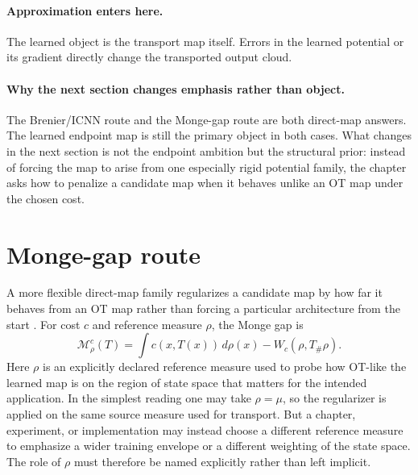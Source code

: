 \paragraph{Approximation enters here.}
The learned object is the transport map itself.  Errors in the learned potential
or its gradient directly change the transported output cloud.

\paragraph{Why the next section changes emphasis rather than object.}
The Brenier/ICNN route and the Monge-gap route are both direct-map answers.  The
learned endpoint map is still the primary object in both cases.  What changes in
the next section is not the endpoint ambition but the structural prior: instead of
forcing the map to arise from one especially rigid potential family, the chapter
asks how to penalize a candidate map when it behaves unlike an OT map under the
chosen cost.

\section{Monge-gap route}
\label{sec:bf-neural-ot-direct-monge-gap}

A more flexible direct-map family regularizes a candidate map by how far it
behaves from an OT map rather than forcing a particular architecture from the
start \citep{uscidda2023mongegap}.  For cost \(c\) and reference measure \(\rho\), the Monge gap is
\begin{equation}
\label{eq:bf-neural-ot-direct-monge-gap}
  \mathcal M_\rho^c(T)
  =
  \int c(x,T(x))\,d\rho(x)-W_c(\rho,T_\#\rho).
\end{equation}
Here \(\rho\) is an explicitly declared reference measure used to probe how
OT-like the learned map is on the region of state space that matters for the
intended application.  In the simplest reading one may take \(\rho=\mu\), so
the regularizer is applied on the same source measure used for transport.  But a
chapter, experiment, or implementation may instead choose a different reference
measure to emphasize a wider training envelope or a different weighting of the
state space.  The role of \(\rho\) must therefore be named explicitly rather than
left implicit.


